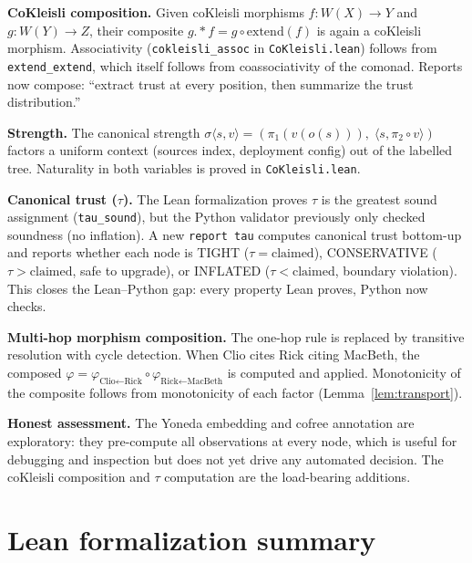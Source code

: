 \documentclass[11pt,a4paper]{article}
\theoremstyle{plain}
\theoremstyle{definition}
\begin{document}
\textbf{CoKleisli composition.} Given coKleisli morphisms $f : W(X) \to Y$ and
$g : W(Y) \to Z$, their composite $g \mathbin{.*} f = g \circ \mathrm{extend}(f)$
is again a coKleisli morphism. Associativity (\texttt{cokleisli\_assoc} in
\texttt{CoKleisli.lean}) follows from \texttt{extend\_extend}, which itself
follows from coassociativity of the comonad. Reports now compose: ``extract
trust at every position, then summarize the trust distribution.''

\textbf{Strength.} The canonical strength $\sigma\langle s, v\rangle =
(\pi_1(v(o(s))),\; \langle s, \pi_2 \circ v\rangle)$ factors a uniform
context (sources index, deployment config) out of the labelled tree. Naturality
in both variables is proved in \texttt{CoKleisli.lean}.

\textbf{Canonical trust ($\tau$).} The Lean formalization proves $\tau$ is the
greatest sound assignment (\texttt{tau\_sound}), but the Python validator
previously only checked soundness (no inflation). A new \texttt{report tau}
computes canonical trust bottom-up and reports whether each node is TIGHT
($\tau = \text{claimed}$), CONSERVATIVE ($\tau > \text{claimed}$, safe to
upgrade), or INFLATED ($\tau < \text{claimed}$, boundary violation). This
closes the Lean--Python gap: every property Lean proves, Python now checks.

\textbf{Multi-hop morphism composition.} The one-hop rule is replaced by
transitive resolution with cycle detection. When Clio cites Rick citing
MacBeth, the composed $\varphi = \varphi_{\text{Clio}\leftarrow\text{Rick}}
\circ \varphi_{\text{Rick}\leftarrow\text{MacBeth}}$ is computed and applied.
Monotonicity of the composite follows from monotonicity of each factor
(Lemma~\ref{lem:transport}).

\textbf{Honest assessment.} The Yoneda embedding and cofree annotation are
exploratory: they pre-compute all observations at every node, which is
useful for debugging and inspection but does not yet drive any automated
decision. The coKleisli composition and $\tau$ computation are the
load-bearing additions.

\section{Lean formalization summary}
\label{sec:lean}
\end{document}
